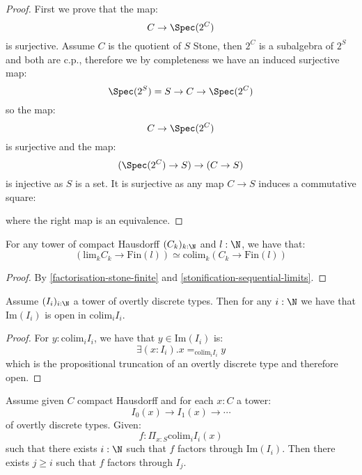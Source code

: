 \begin{proof}
First we prove that the map:
\[C\to \Spec(2^C)\]
is surjective. Assume $C$ is the quotient of $S$ Stone, then $2^C$ is a subalgebra of $2^S$ and both are c.p., therefore we by completeness we have an induced surjective map:
\[\Spec(2^S) = S\to C\to \Spec(2^C)\]
so the map:
\[C\to \Spec(2^C)\]
is surjective and the map:
\[(\Spec(2^C) \to S) \to (C\to S) \]
is injective as $S$ is a set. It is surjective as any map $C\to S$ induces a commutative square:
\begin{center}
\end{center}
where the right map is an equivalence.
\end{proof}

\begin{lemma}\label{factorisation-compact-hausdorff-finite}
For any tower of compact Hausdorff $(C_k)_{k:\N}$ and $l:\N$, we have that:
\[\left(\mathrm{lim}_kC_k\to \mathrm{Fin}(l)\right) \simeq \mathrm{colim}_k (C_k\to \mathrm{Fin}(l))\]
\end{lemma}

\begin{proof}
By \cref{factorisation-stone-finite} and \cref{stonification-sequential-limits}.
\end{proof}

\begin{lemma}\label{overtly-discrete-union-open}
Assume $(I_i)_{i:\N}$ a tower of overtly discrete types. Then for any $i:\N$ we have that $\mathrm{Im}(I_i)$ is open in $\mathrm{colim}_i I_i$. 
\end{lemma}

\begin{proof}
For $y:\mathrm{colim}_iI_i$, we have that $y\in \mathrm{Im}(I_i)$ is:
\[\exists(x:I_i). x=_{\mathrm{colim}_iI_i}y\]
which is the propositional truncation of an overtly discrete type and therefore open.
\end{proof}

\begin{lemma}\label{factorisation-image-true-factorisation}
Assume given $C$ compact Hausdorff and for each $x:C$ a tower:
\[I_0(x)\to I_1(x)\to \cdots\]
of overtly discrete types. Given:
\[f:\Pi_{x:S}\mathrm{colim}_i I_i(x)\]
such that there exists $i:\N$ such that $f$ factors through $\mathrm{Im}(I_i)$. Then there exists $j\geq i$ such that $f$ factors through $I_j$.
\end{lemma}

